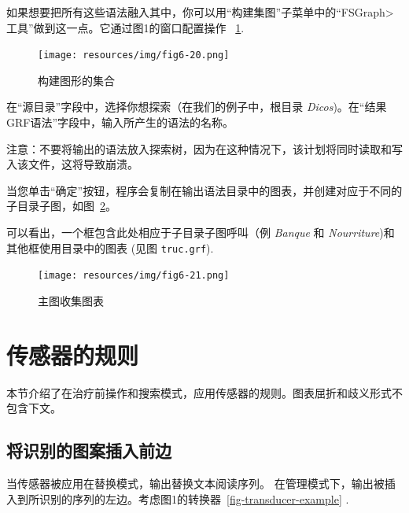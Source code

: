 \noindent 如果想要把所有这些语法融入其中，你可以用“构建集图”子菜单中的“FSGraph>工具”做到这一点。它通过图1的窗口配置操作
~\ref{fig-build-graph-collection}.

\begin{figure}[!h]
\begin{center}
\texttt{[image: resources/img/fig6-20.png]}
\caption{构建图形的集合\label{fig-build-graph-collection}}
\end{center}
\end{figure}

\noindent 
在“源目录”字段中，选择你想探索（在我们的例子中，根目录 \textit{Dicos})。在“结果GRF语法”字段中，输入所产生的语法的名称。


\bigskip
\noindent 注意：不要将输出的语法放入探索树，因为在这种情况下，该计划将同时读取和写入该文件，这将导致崩溃。

\bigskip
\noindent 当您单击“确定”按钮，程序会复制在输出语法目录中的图表，并创建对应于不同的子目录子图，如图~\ref{fig-graph-collection}。

\bigskip
\noindent 
可以看出，一个框包含此处相应于子目录子图呼叫（例 \textit{Banque}
和 \textit{Nourriture})和其他框使用目录中的图表 (见图 \texttt{truc.grf}).

\begin{figure}[!h]
\begin{center}
\texttt{[image: resources/img/fig6-21.png]}
\caption{主图收集图表\label{fig-graph-collection}}
\end{center}
\end{figure}



\section{传感器的规则}
\label{section-applying-transducers-rules}
本节介绍了在治疗前操作和搜索模式，应用传感器的规则。图表屈折和歧义形式不包含下文。


\subsection{将识别的图案插入前边}
当传感器被应用在替换模式，输出替换文本阅读序列。
在管理模式下，输出被插入到所识别的序列的左边。考虑图1的转换器~\ref{fig-transducer-example}
. 

